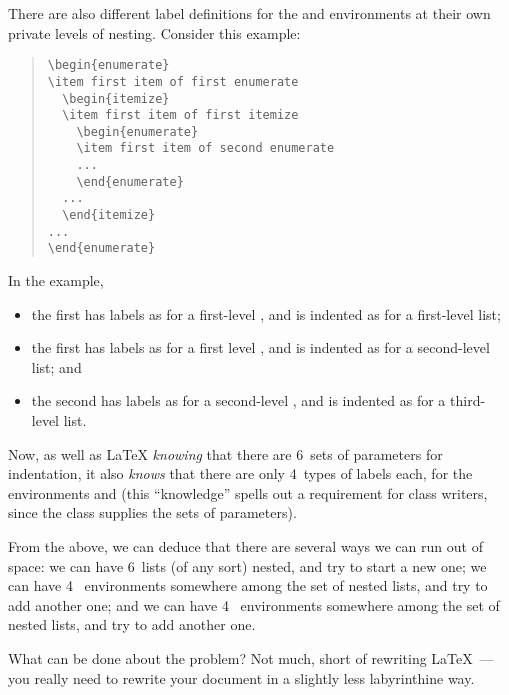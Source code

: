 {There are also different label definitions for the
 and  environments at
their own private levels of nesting.  Consider this example:
\begin{quote}
\begin{verbatim}
\begin{enumerate}
\item first item of first enumerate
  \begin{itemize}
  \item first item of first itemize
    \begin{enumerate}
    \item first item of second enumerate
    ...
    \end{enumerate}
  ...
  \end{itemize}
...
\end{enumerate}
\end{verbatim}
\end{quote}
In the example,
\begin{itemize}
\item the first  has labels as for a
  first-level , and is indented as for a
  first-level list;
\item the first  has labels as for a first level
  , and is indented as for a second-level list;
  and
\item the second  has labels as for a
  second-level , and is indented as for a
  third-level list.
\end{itemize}
Now, as well as \LaTeX{} \emph{knowing} that there are 6~sets of
parameters for indentation, it also \emph{knows} that there are only
4~types of labels each, for the environments 
and  (this ``knowledge'' spells out a requirement
for class writers, since the class supplies the sets of parameters).

From the above, we can deduce that there are several ways we can run
out of space: we can have 6~lists (of any sort) nested, and try to
start a new one; we can have 4~ environments
somewhere among the set of nested lists, and try to add another one;
and we can have 4~ environments somewhere among
the set of nested lists, and try to add another one.

What can be done about the problem?  Not much, short of rewriting
\LaTeX{}~--- you really need to rewrite your document in a slightly
less labyrinthine way.

}
